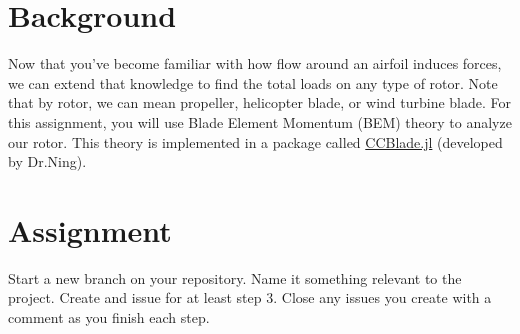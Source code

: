 \documentclass[12pt]{article}
\begin{document}
	

\section{Background}

Now that you've become familiar with how flow around an airfoil induces forces, we can extend that knowledge to find the total loads on any type of rotor. Note that by rotor, we can mean propeller, helicopter blade, or wind turbine blade. For this assignment, you will use Blade Element Momentum (BEM) theory to analyze our rotor.  This theory is implemented in a package called \href{https://github.com/byuflowlab/CCBlade.jl}{CCBlade.jl} (developed by Dr.Ning). 


\section{Assignment}
Start a new branch on your repository. Name it something relevant to the project. Create and issue for at least step 3. Close any issues you create with a comment as you finish each step. 
\end{document}
